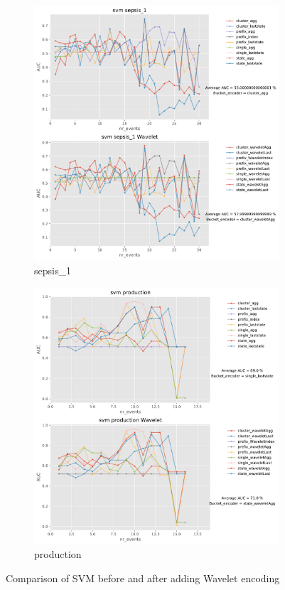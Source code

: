\documentclass[twoside,11pt]{Latex/Classes/PhDthesisPSnPDF}
\begin{document}
\begin{figure}[!htbp]
	\medskip
	\begin{subfigure}{0.48\textwidth}
		\includegraphics[width=\linewidth]{images/wavelet/graphs2svm/sepsis_1.pdf}	
		\caption{sepsis\_1} 
	\end{subfigure}\hspace*{\fill}
	\begin{subfigure}{0.48\textwidth}
		\includegraphics[width=\linewidth]{images/wavelet/graphs2svm/production.pdf}
		\caption{production}
	\end{subfigure}
		\caption{Comparison of SVM before and after adding Wavelet encoding}
	\label{fig:ws1}
\end{figure}
\end{document}
